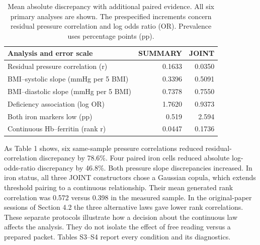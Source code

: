 \documentclass[sigconf,anonymous,nonacm]{acmart}
\begin{document}
\begin{table}[t]

\caption{Mean absolute discrepancy with additional paired evidence. All six primary analyses are shown. The prespecified increments concern residual pressure correlation and log odds ratio (OR). Prevalence uses percentage points (pp).}

\label{tab:1}

\centering\small

\renewcommand{\arraystretch}{1.12}

\begin{tabularx}{\linewidth}{@{}>{\raggedright\arraybackslash}Xrr@{}}

\toprule

Analysis and error scale & SUMMARY & JOINT \\

\midrule

Residual pressure correlation (r) & 0.1633 & 0.0350 \\

BMI–\allowbreak{}systolic slope (mmHg per 5 BMI) & 0.3396 & 0.5091 \\

BMI–\allowbreak{}diastolic slope (mmHg per 5 BMI) & 0.7378 & 0.7550 \\

Deficiency association (log OR) & 1.7620 & 0.9373 \\

Both iron markers low (pp) & 0.519 & 2.594 \\

Continuous Hb–\allowbreak{}ferritin (rank r) & 0.0447 & 0.1736 \\

\bottomrule

\end{tabularx}

\end{table}

As Table 1 shows, six same-sample pressure correlations reduced residual-correlation discrepancy by 78.6\%. Four paired iron cells reduced absolute log-odds-ratio discrepancy by 46.8\%. Both pressure slope discrepancies increased. In iron status, all three JOINT constructors chose a Gaussian copula, which extends threshold pairing to a continuous relationship. Their mean generated rank correlation was 0.572 versus 0.398 in the measured sample. In the original-paper sessions of Section 4.2 the three alternative laws gave lower rank correlations. These separate protocols illustrate how a decision about the continuous law affects the analysis. They do not isolate the effect of free reading versus a prepared packet. Tables S3–\allowbreak{}S4 report every condition and its diagnostics.
\end{document}
